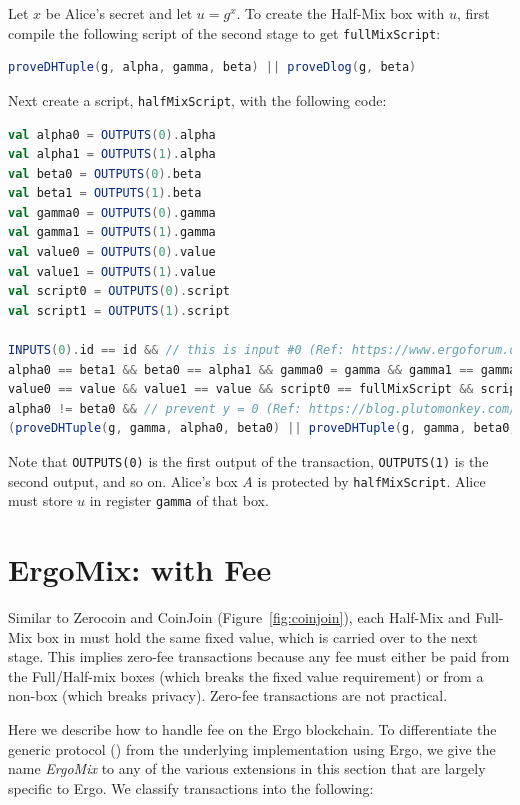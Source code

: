 \documentclass[runningheads]{llncs}
\newcommand{\mixname}{ErgoMix\xspace}
\newcommand{\zerocoin}{Zerocoin\xspace}
\begin{document}
Let $x$ be Alice's secret and let $u = g^x$. To create the Half-Mix box with $u$, first compile the following script of the second stage to get \texttt{fullMixScript}:

\begin{lstlisting}[language=Scala,caption={Full mix script},label=fullMixScript]
proveDHTuple(g, alpha, gamma, beta) || proveDlog(g, beta)
\end{lstlisting}

Next create a script, \texttt{halfMixScript}, with the following code:
\begin{lstlisting}[language=Scala,caption={Half mix script},label=halfMixScript]
val alpha0 = OUTPUTS(0).alpha
val alpha1 = OUTPUTS(1).alpha
val beta0 = OUTPUTS(0).beta
val beta1 = OUTPUTS(1).beta
val gamma0 = OUTPUTS(0).gamma
val gamma1 = OUTPUTS(1).gamma
val value0 = OUTPUTS(0).value
val value1 = OUTPUTS(1).value
val script0 = OUTPUTS(0).script
val script1 = OUTPUTS(1).script

INPUTS(0).id == id && // this is input #0 (Ref: https://www.ergoforum.org/t/lets-play-with-ergomix/108/7)
alpha0 == beta1 && beta0 == alpha1 && gamma0 = gamma && gamma1 == gamma && 
value0 == value && value1 == value && script0 == fullMixScript && script1 == fullMixScript &&
alpha0 != beta0 && // prevent y = 0 (Ref: https://blog.plutomonkey.com/2020/04/ergomix-vulnerability/)
(proveDHTuple(g, gamma, alpha0, beta0) || proveDHTuple(g, gamma, beta0, alpha0))
\end{lstlisting}

Note that \texttt{OUTPUTS(0)} is the first output of the transaction, \texttt{OUTPUTS(1)} is the second output, and so on. Alice's box $A$ is protected by \texttt{halfMixScript}. Alice must store $u$ in register \texttt{gamma} of that box.


\section{\mixname: \algname with Fee}
\label{fee}

Similar to \zerocoin and CoinJoin (Figure~\ref{fig:coinjoin}), each Half-Mix and Full-Mix box in \algname must hold the same fixed value, which is carried over to the next stage. This implies zero-fee transactions because any fee must either be paid from the Full/Half-mix boxes (which breaks the fixed value requirement) or from a non-\algname box (which breaks privacy). Zero-fee transactions are not practical. 

Here we describe how to handle fee on the Ergo blockchain. To differentiate the generic protocol (\algname) from the underlying implementation using Ergo, we give the name {\em \mixname} to any of the various extensions in this section that are largely specific to Ergo. 
We classify \algname transactions into the following:
\end{document}
